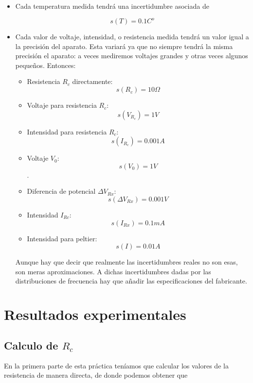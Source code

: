 \documentclass[12pt,a4paper]{article}
\begin{document}
\begin{itemize}
\item Cada temperatura medida tendrá una incertidumbre asociada de

\begin{equation}
s(T) = 0.1 C^o
\end{equation}

\item Cada valor de voltaje, intensidad, o resistencia medida tendrá un valor igual a la precisión del aparato. Esta variará ya que no siempre tendrá la misma precisión el aparato: a veces mediremos voltajes grandes y otras veces algunos pequeños. Entonces:

\begin{itemize}
\item Resistencia $R_c$ directamente: $$s(R_c) = 10 \Omega$$
\item Voltaje para resistencia $R_c$: $$s(V_{R_c}) = 1 V$$
\item Intensidad para resistencia $R_c$: $$s(I_{R_c}) = 0.001A$$
\item Voltaje $V_0$: $$s(V_0) = 1 V$$.
\item Diferencia de potencial $\Delta V_{Rx}$: $$ s(\Delta V_{Rx}) = 0.001 V $$
\item Intensidad $I_{Rc}$: $$ s(I_{Rx}) = 0.1 mA $$
\item Intensidad para peltier: $$ s(I) = 0.01 A $$
\end{itemize}

Aunque hay que decir que realmente las incertidumbres reales no son esas, son meras aproximaciones. A dichas incertidumbres dadas por las distribuciones de frecuencia hay que añadir las especificaciones del fabricante.

\end{itemize}


\newpage

\section{Resultados experimentales}

\subsection{Calculo de $R_c$}


En la primera parte de esta práctica teníamos que calcular los valores de la resistencia de manera directa, de donde podemos obtener que
\end{document}
